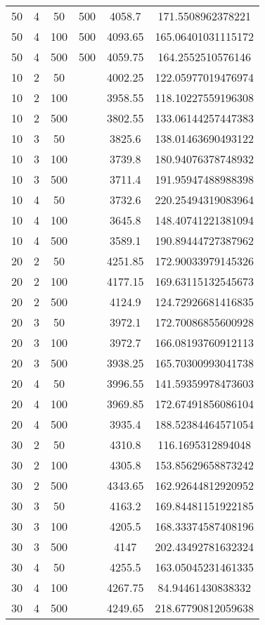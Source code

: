 {\begin{longtabu}{S
S
S
S
S[round-mode=places, round-precision=0]
S[round-mode=places, round-precision=0]}
50 & 4 & 50 & 500 & 4058.7 & 171.5508962378221 \\
50 & 4 & 100 & 500 & 4093.65 & 165.06401031115172 \\
50 & 4 & 500 & 500 & 4059.75 & 164.2552510576146 \\
10 & 2 & 50 & & 4002.25 & 122.05977019476974 \\
10 & 2 & 100 & & 3958.55 & 118.10227559196308 \\
10 & 2 & 500 & & 3802.55 & 133.06144257447383 \\
10 & 3 & 50 & & 3825.6 & 138.01463690493122 \\
10 & 3 & 100 & & 3739.8 & 180.94076378748932 \\
10 & 3 & 500 & & 3711.4 & 191.95947488988398 \\
10 & 4 & 50 & & 3732.6 & 220.25494319083964 \\
10 & 4 & 100 & & 3645.8 & 148.40741221381094 \\
10 & 4 & 500 & & 3589.1 & 190.89444727387962 \\
20 & 2 & 50 & & 4251.85 & 172.90033979145326 \\
20 & 2 & 100 & & 4177.15 & 169.63115132545673 \\
20 & 2 & 500 & & 4124.9 & 124.72926681416835 \\
20 & 3 & 50 & & 3972.1 & 172.70086855600928 \\
20 & 3 & 100 & & 3972.7 & 166.08193760912113 \\
20 & 3 & 500 & & 3938.25 & 165.70300993041738 \\
20 & 4 & 50 & & 3996.55 & 141.59359978473603 \\
20 & 4 & 100 & & 3969.85 & 172.67491856086104 \\
20 & 4 & 500 & & 3935.4 & 188.52384464571054 \\
30 & 2 & 50 & & 4310.8 & 116.1695312894048 \\
30 & 2 & 100 & & 4305.8 & 153.85629658873242 \\
30 & 2 & 500 & & 4343.65 & 162.92644812920952 \\
30 & 3 & 50 & & 4163.2 & 169.84481151922185 \\
30 & 3 & 100 & & 4205.5 & 168.33374587408196 \\
30 & 3 & 500 & & 4147 & 202.43492781632324 \\
30 & 4 & 50 & & 4255.5 & 163.05045231461335 \\
30 & 4 & 100 & & 4267.75 & 84.94461430838332 \\
30 & 4 & 500 & & 4249.65 & 218.67790812059638 \\

\end{longtabu}}
